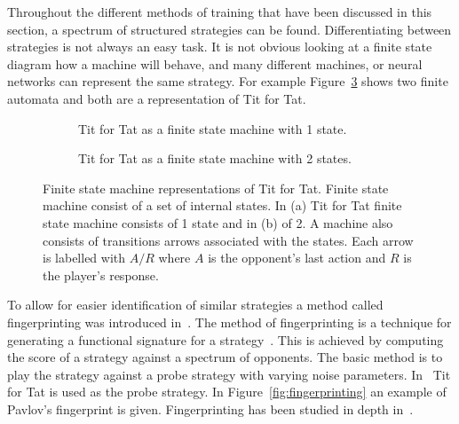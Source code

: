 \documentclass{article}
\theoremstyle{definition}
\begin{document}
Throughout the different methods of training that have been discussed in this
section, a spectrum of structured strategies can be found. Differentiating
between strategies is not always an easy task. It is not obvious looking at a
finite state diagram how a machine will behave, and many different machines, or
neural networks can represent the same strategy. For example
Figure~\ref{fig:machine_tft} shows two finite automata and both are a
representation of Tit for Tat.

\begin{figure}[!hbtp]
    \begin{subfigure}{.45\textwidth}\centering
        
        \caption{Tit for Tat as a finite state machine with 1 state.}\label{fig:representation_a}
    \end{subfigure}
    \begin{subfigure}{.45\textwidth}\centering
        
        \caption{Tit for Tat as a finite state machine with 2 states.}\label{fig:representation_b}
     \end{subfigure}
     \caption{Finite state machine representations of Tit for Tat. Finite state
     machine consist of a set of internal states. In (a) Tit for Tat finite state
     machine consists of 1 state and in (b) of 2. A machine also consists of transitions
     arrows associated with the states. Each arrow is labelled with \(A/R\) where
     \(A\) is the opponent's last action and \(R\) is the player's response.}\label{fig:machine_tft}
\end{figure}

To allow for easier identification of similar strategies a method called
fingerprinting was introduced in~\cite{Ashlock2005}. The method of fingerprinting is a
technique for generating a functional signature for a
strategy~\cite{Ashlock2008}. This is achieved by computing the score of a
strategy against a spectrum of opponents. The basic method is to play the
strategy against a probe strategy with varying noise parameters.
In~\cite{Ashlock2005} Tit for Tat is used as the probe strategy. In
Figure~\ref{fig:fingerprinting} an example of Pavlov's fingerprint is given.
Fingerprinting has been studied in depth in~\cite{Ashlock2008, Ashlock2009,
Ashlock2010, Ashlock2006a}.
\end{document}
